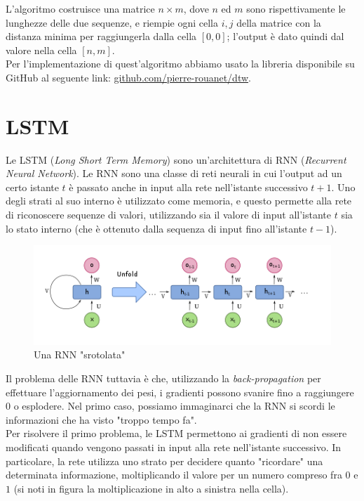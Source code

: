 \documentclass[8pt,notitlepage]{report}
\begin{document}
		L'algoritmo costruisce una matrice $ n \times m $, dove $ n $ ed $ m $ sono rispettivamente le lunghezze delle due sequenze, e riempie ogni cella $ i, j $ della matrice con la distanza minima per raggiungerla dalla cella $ [0, 0] $; l'output è dato quindi dal valore nella cella $ [n, m] $. \\
		Per l'implementazione di quest'algoritmo abbiamo usato la libreria disponibile su GitHub al seguente link: \href{https://github.com/pierre-rouanet/dtw}{github.com/pierre-rouanet/dtw}.
		
		\newpage
		

	\section{LSTM}
		Le LSTM (\textit{Long Short Term Memory}) sono un'architettura di RNN (\textit{Recurrent Neural Network}). Le RNN sono una classe di reti neurali in cui l'output ad un certo istante $ t $ è passato anche in input alla rete nell'istante successivo $ t + 1 $. Uno degli strati al suo interno è utilizzato come memoria, e questo permette alla rete di riconoscere sequenze di valori, utilizzando sia il valore di input all'istante $ t $ sia lo stato interno (che è ottenuto dalla sequenza di input fino all'istante $ t - 1 $). 
		
		\begin{figure}[H]
			\begin{center}
				\includegraphics[scale=.55]{rnn}
				\caption{Una RNN "srotolata"}
			\end{center}
		\end{figure}
		
		Il problema delle RNN tuttavia è che, utilizzando la \textit{back-propagation} per effettuare l'aggiornamento dei pesi, i gradienti possono svanire fino a raggiungere $ 0 $ o esplodere. Nel primo caso, possiamo immaginarci che la RNN si scordi le informazioni che ha visto "troppo tempo fa". \\
		Per risolvere il primo problema, le LSTM permettono ai gradienti di non essere modificati quando vengono passati in input alla rete nell'istante successivo. In particolare, la rete utilizza uno strato per decidere quanto "ricordare" una determinata informazione, moltiplicando il valore per un numero compreso fra $ 0 $ e $ 1 $ (si noti in figura la moltiplicazione in alto a sinistra nella cella).
		
\end{document}
